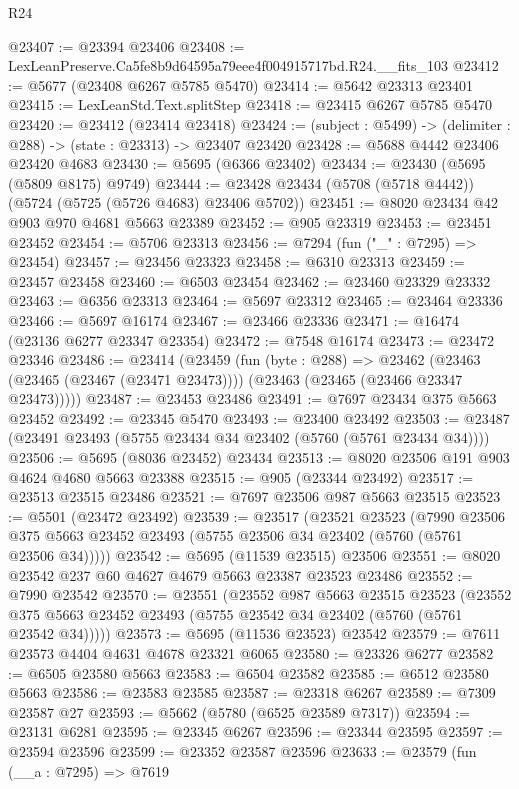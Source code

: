 \begin{lexlean}{R24}
\begin{coremodule}
@23407 := @23394 @23406
@23408 := LexLeanPreserve.Ca5fe8b9d64595a79eee4f004915717bd.R24.__fits_103
@23412 := @5677 (@23408 @6267 @5785 @5470)
@23414 := @5642 @23313 @23401
@23415 := LexLeanStd.Text.splitStep
@23418 := @23415 @6267 @5785 @5470
@23420 := @23412 (@23414 @23418)
@23424 := (subject : @5499) -> (delimiter : @288) -> (state : @23313) -> @23407 @23420
@23428 := @5688 @4442 @23406 @23420 @4683
@23430 := @5695 (@6366 @23402)
@23434 := @23430 (@5695 (@5809 @8175) @9749)
@23444 := @23428 @23434 (@5708 (@5718 @4442)) (@5724 (@5725 (@5726 @4683) @23406 @5702))
@23451 := @8020 @23434 @42 @903 @970 @4681 @5663 @23389
@23452 := @905 @23319
@23453 := @23451 @23452
@23454 := @5706 @23313
@23456 := @7294 (fun ("_" : @7295) => @23454)
@23457 := @23456 @23323
@23458 := @6310 @23313
@23459 := @23457 @23458
@23460 := @6503 @23454
@23462 := @23460 @23329 @23332
@23463 := @6356 @23313
@23464 := @5697 @23312
@23465 := @23464 @23336
@23466 := @5697 @16174
@23467 := @23466 @23336
@23471 := @16474 (@23136 @6277 @23347 @23354)
@23472 := @7548 @16174
@23473 := @23472 @23346
@23486 := @23414
    (@23459
      (fun (byte : @288) =>
      @23462 (@23463 (@23465 (@23467 (@23471 @23473)))) (@23463 (@23465 (@23466 @23347 @23473)))))
@23487 := @23453 @23486
@23491 := @7697 @23434 @375 @5663 @23452
@23492 := @23345 @5470
@23493 := @23400 @23492
@23503 := @23487 (@23491 @23493 (@5755 @23434 @34 @23402 (@5760 (@5761 @23434 @34))))
@23506 := @5695 (@8036 @23452) @23434
@23513 := @8020 @23506 @191 @903 @4624 @4680 @5663 @23388
@23515 := @905 (@23344 @23492)
@23517 := @23513 @23515 @23486
@23521 := @7697 @23506 @987 @5663 @23515
@23523 := @5501 (@23472 @23492)
@23539 := @23517
    (@23521
      @23523
      (@7990 @23506 @375 @5663 @23452 @23493 (@5755 @23506 @34 @23402 (@5760 (@5761 @23506 @34)))))
@23542 := @5695 (@11539 @23515) @23506
@23551 := @8020 @23542 @237 @60 @4627 @4679 @5663 @23387 @23523 @23486
@23552 := @7990 @23542
@23570 := @23551
    (@23552
      @987
      @5663
      @23515
      @23523
      (@23552 @375 @5663 @23452 @23493 (@5755 @23542 @34 @23402 (@5760 (@5761 @23542 @34)))))
@23573 := @5695 (@11536 @23523) @23542
@23579 := @7611 @23573 @4404 @4631 @4678 @23321 @6065
@23580 := @23326 @6277
@23582 := @6505 @23580 @5663
@23583 := @6504 @23582
@23585 := @6512 @23580 @5663
@23586 := @23583 @23585
@23587 := @23318 @6267
@23589 := @7309 @23587 @27
@23593 := @5662 (@5780 (@6525 @23589 @7317))
@23594 := @23131 @6281
@23595 := @23345 @6267
@23596 := @23344 @23595
@23597 := @23594 @23596
@23599 := @23352 @23587 @23596
@23633 := @23579
    (fun (__a : @7295) =>
    @7619

\end{coremodule}
\end{lexlean}
